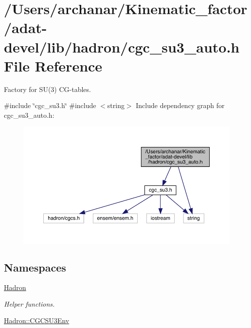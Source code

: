 \hypertarget{adat-devel_2lib_2hadron_2cgc__su3__auto_8h}{}\section{/\+Users/archanar/\+Kinematic\+\_\+factor/adat-\/devel/lib/hadron/cgc\+\_\+su3\+\_\+auto.h File Reference}
\label{adat-devel_2lib_2hadron_2cgc__su3__auto_8h}


Factory for S\+U(3) C\+G-\/tables.  


{\ttfamily \#include \char`\"{}cgc\+\_\+su3.\+h\char`\"{}}\newline
{\ttfamily \#include $<$string$>$}\newline
Include dependency graph for cgc\+\_\+su3\+\_\+auto.\+h\+:
\nopagebreak
\begin{figure}[H]
\begin{center}
\leavevmode
\includegraphics[width=350pt]{d4/d14/adat-devel_2lib_2hadron_2cgc__su3__auto_8h__incl}
\end{center}
\end{figure}
\subsection*{Namespaces}
\begin{DoxyCompactItemize}
\item 
 \mbox{\hyperlink{namespaceHadron}{Hadron}}
\begin{DoxyCompactList}\small\item\em Helper functions. \end{DoxyCompactList}\item 
 \mbox{\hyperlink{namespaceHadron_1_1CGCSU3Env}{Hadron\+::\+C\+G\+C\+S\+U3\+Env}}
\end{DoxyCompactItemize}
